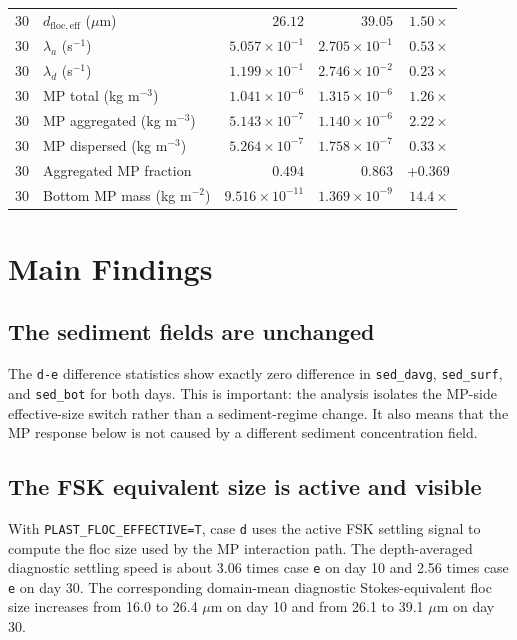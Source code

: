\documentclass[11pt]{article}
\begin{document}
\begin{longtable}{llrrr}
30 & $d_{\mathrm{floc,eff}}$ ($\mu$m) & $26.12$ & $39.05$ & $1.50{\times}$ \\
30 & $\lambda_a$ (s$^{-1}$) & $5.057{\times}10^{-1}$ & $2.705{\times}10^{-1}$ & $0.53{\times}$ \\
30 & $\lambda_d$ (s$^{-1}$) & $1.199{\times}10^{-1}$ & $2.746{\times}10^{-2}$ & $0.23{\times}$ \\
30 & MP total (kg m$^{-3}$) & $1.041{\times}10^{-6}$ & $1.315{\times}10^{-6}$ & $1.26{\times}$ \\
30 & MP aggregated (kg m$^{-3}$) & $5.143{\times}10^{-7}$ & $1.140{\times}10^{-6}$ & $2.22{\times}$ \\
30 & MP dispersed (kg m$^{-3}$) & $5.264{\times}10^{-7}$ & $1.758{\times}10^{-7}$ & $0.33{\times}$ \\
30 & Aggregated MP fraction & $0.494$ & $0.863$ & $+0.369$ \\
30 & Bottom MP mass (kg m$^{-2}$) & $9.516{\times}10^{-11}$ & $1.369{\times}10^{-9}$ & $14.4{\times}$ \\
\end{longtable}
\normalsize

\section*{Main Findings}

\subsection*{The sediment fields are unchanged}

The \texttt{d-e} difference statistics show exactly zero difference in
\texttt{sed\_davg}, \texttt{sed\_surf}, and \texttt{sed\_bot} for both days.
This is important: the analysis isolates the MP-side effective-size switch
rather than a sediment-regime change.  It also means that the MP response below
is not caused by a different sediment concentration field.

\subsection*{The FSK equivalent size is active and visible}

With \texttt{PLAST\_FLOC\_EFFECTIVE=T}, case \texttt{d} uses the active FSK
settling signal to compute the floc size used by the MP interaction path.  The
depth-averaged diagnostic settling speed is about 3.06 times case \texttt{e}
on day 10 and 2.56 times case \texttt{e} on day 30.  The corresponding
domain-mean diagnostic Stokes-equivalent floc size increases from 16.0 to
26.4 $\mu$m on day 10 and from 26.1 to 39.1 $\mu$m on day 30.
\end{document}
